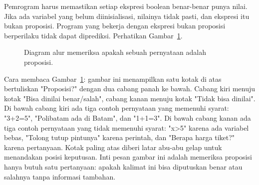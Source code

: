 \documentclass[11pt,a4paper]{article}
\begin{document}
Pemrogram harus memastikan setiap ekspresi boolean benar-benar punya nilai. Jika ada variabel yang belum diinisialisasi, nilainya tidak pasti, dan ekspresi itu bukan proposisi. Program yang bekerja dengan ekspresi bukan proposisi berperilaku tidak dapat diprediksi. Perhatikan Gambar~\ref{fig:proposisi}.

\begin{figure}[H]
	\centering
	\caption{Diagram alur memeriksa apakah sebuah pernyataan adalah proposisi.}
	\label{fig:proposisi}
\end{figure}

Cara membaca Gambar~\ref{fig:proposisi}: gambar ini menampilkan satu kotak di atas bertuliskan "Proposisi?" dengan dua cabang panah ke bawah. Cabang kiri menuju kotak "Bisa dinilai benar/salah", cabang kanan menuju kotak "Tidak bisa dinilai". Di bawah cabang kiri ada tiga contoh pernyataan yang memenuhi syarat: "3+2=5", "Polibatam ada di Batam", dan "1+1=3". Di bawah cabang kanan ada tiga contoh pernyataan yang tidak memenuhi syarat: "x>5" karena ada variabel bebas, "Tolong tutup pintunya" karena perintah, dan "Berapa harga tiket?" karena pertanyaan. Kotak paling atas diberi latar abu-abu gelap untuk menandakan posisi keputusan. Inti pesan gambar ini adalah memeriksa proposisi hanya butuh satu pertanyaan: apakah kalimat ini bisa diputuskan benar atau salahnya tanpa informasi tambahan.
\end{document}
